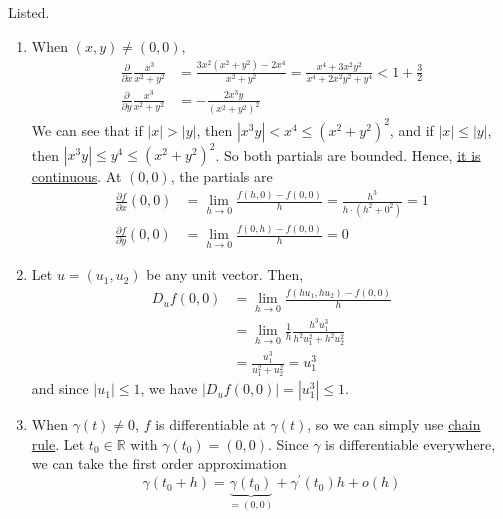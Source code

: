 	\begin{solution}
		Listed. 
		\begin{enumerate}
		  \item When $(x, y) \neq (0, 0)$, 
				\begin{align}
					\frac{\partial}{\partial x} \frac{x^3}{x^2 + y^2} & = \frac{3x^2 (x^2 + y^2) - 2x^4}{x^2 + y^2} = \frac{x^4 + 3x^2 y^2}{x^4 + 2x^2 y^2 + y^4} < 1 + \frac{3}{2} \\ 
					\frac{\partial}{\partial y} \frac{x^3}{x^2 + y^2} & = -\frac{2 x^3 y}{(x^2 + y^2)^2} 
				\end{align}
				We can see that if $|x| > |y|$, then $|x^3 y| < x^4 \leq (x^2 + y^2)^2$, and if $|x| \leq  |y|$, then $|x^3 y| \leq y^4 \leq (x^2 + y^2)^2$. So both partials are bounded. Hence, \hyperref[thm:bounded_partials_continuous]{it is continuous}. At $(0, 0)$, the partials are 
				\begin{align}
					\frac{\partial f}{\partial x} (0, 0) & = \lim_{h \to 0} \frac{f(h, 0) - f(0, 0)}{h} = \frac{h^3}{h \cdot (h^2 + 0^2)} = 1 \\ 
					\frac{\partial f}{\partial y} (0, 0) & = \lim_{h \to 0} \frac{f(0, h) - f(0, 0)}{h} = 0
				\end{align}

			\item Let $u = (u_1, u_2)$ be any unit vector. Then, 
				\begin{align}
					D_u f(0, 0) & = \lim_{h \to 0} \frac{f(hu_1, hu_2) - f(0, 0)}{h}  \\ 
											& = \lim_{h \to 0} \frac{1}{h} \frac{h^3 u_1^3}{h^2 u_1^2 + h^2 u_2^2} \\ 
											& = \frac{u_1^3}{u_1^2 + u_2^2} = u_1^3
				\end{align}
				and since $|u_1| \leq 1$, we have $|D_u f(0, 0)| = |u_1^3| \leq 1$. 

			\item When $\gamma(t) \neq 0$, $f$ is differentiable at  $\gamma(t)$, so we can simply use \hyperref[thm:chain-rule]{chain rule}. Let $t_0 \in \mathbb{R}$ with $\gamma (t_0) = (0, 0)$. Since $\gamma$ is differentiable everywhere, we can take the first order approximation 
				\begin{equation}
					\gamma(t_0 + h) = \underbrace{\gamma(t_0)}_{= (0, 0)} + \gamma^\prime (t_0) h + o(h) 
				\end{equation}


\end{enumerate}
\end{solution}
